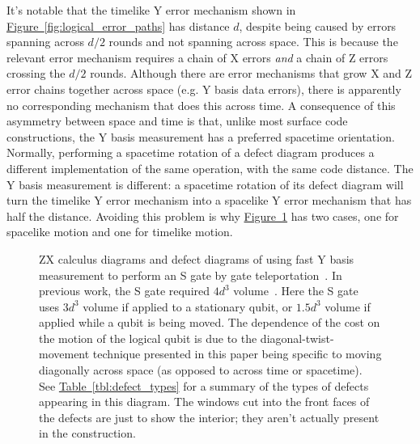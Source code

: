 \documentclass[onecolumn,unpublished,a4paper]{quantumarticle}
\theoremstyle{definition}
\theoremstyle{definition}
\theoremstyle{definition}
\newcommand{\fig}[1]{\hyperref[fig:#1]{Figure~\ref*{fig:#1}}}
\newcommand{\tbl}[1]{\hyperref[tbl:#1]{Table~\ref*{tbl:#1}}}
\begin{document}
It's notable that the timelike Y error mechanism shown in \fig{logical_error_paths} has distance $d$, despite being caused by errors spanning across $d/2$ rounds and not spanning across space.
This is because the relevant error mechanism requires a chain of X errors \emph{and} a chain of Z errors crossing the $d/2$ rounds.
Although there are error mechanisms that grow X and Z error chains together across space (e.g. Y basis data errors), there is apparently no corresponding mechanism that does this across time.
A consequence of this asymmetry between space and time is that, unlike most surface code constructions, the Y basis measurement has a preferred spacetime orientation.
Normally, performing a spacetime rotation of a defect diagram produces a different implementation of the same operation, with the same code distance.
The Y basis measurement is different: a spacetime rotation of its defect diagram will turn the timelike Y error mechanism into a spacelike Y error mechanism that has half the distance.
Avoiding this problem is why \fig{other_improvements} has two cases, one for spacelike motion and one for timelike motion.

\begin{figure}
    \centering
    \caption{
        ZX calculus diagrams and defect diagrams of using fast Y basis measurement to perform an S gate by gate teleportation~\cite{gottesman1999gateteleport}.
        In previous work, the S gate required $4 d^3$  volume~\cite{bombin2021logical,chamberland2022universal}.
        Here the S gate uses $3 d^3$ volume if applied to a stationary qubit, or $1.5d^3$ volume if applied while a qubit is being moved.
        The dependence of the cost on the motion of the logical qubit is due to the diagonal-twist-movement technique presented in this paper being specific to moving diagonally across space (as opposed to across time or spacetime).
        See \tbl{defect_types} for a summary of the types of defects appearing in this diagram.
        The windows cut into the front faces of the defects are just to show the interior; they aren't actually present in the construction.
    }
    \label{fig:other_improvements}
\end{figure}
\end{document}
